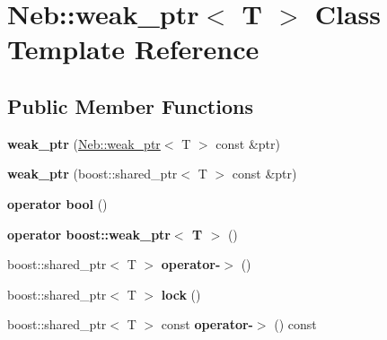 \hypertarget{classNeb_1_1weak__ptr}{\section{Neb\-:\-:weak\-\_\-ptr$<$ T $>$ Class Template Reference}
\label{classNeb_1_1weak__ptr}
}
\subsection*{Public Member Functions}
\begin{DoxyCompactItemize}
\item 
\hypertarget{classNeb_1_1weak__ptr_a831fec6c1355a9d91e834099c0dc6227}{{\bfseries weak\-\_\-ptr} (\hyperlink{classNeb_1_1weak__ptr}{Neb\-::weak\-\_\-ptr}$<$ T $>$ const \&ptr)}\label{classNeb_1_1weak__ptr_a831fec6c1355a9d91e834099c0dc6227}

\item 
\hypertarget{classNeb_1_1weak__ptr_ad29ba574546701e7ed8a0b452dcd76a6}{{\bfseries weak\-\_\-ptr} (boost\-::shared\-\_\-ptr$<$ T $>$ const \&ptr)}\label{classNeb_1_1weak__ptr_ad29ba574546701e7ed8a0b452dcd76a6}

\item 
\hypertarget{classNeb_1_1weak__ptr_a04c92f7e5ec8e3e83d2abce8365b8feb}{{\bfseries operator bool} ()}\label{classNeb_1_1weak__ptr_a04c92f7e5ec8e3e83d2abce8365b8feb}

\item 
\hypertarget{classNeb_1_1weak__ptr_ab67828010c104deb340eb460148b651d}{{\bfseries operator boost\-::weak\-\_\-ptr$<$ T $>$} ()}\label{classNeb_1_1weak__ptr_ab67828010c104deb340eb460148b651d}

\item 
\hypertarget{classNeb_1_1weak__ptr_afb380fd10451d5f26809091e54cde62f}{boost\-::shared\-\_\-ptr$<$ T $>$ {\bfseries operator-\/$>$} ()}\label{classNeb_1_1weak__ptr_afb380fd10451d5f26809091e54cde62f}

\item 
\hypertarget{classNeb_1_1weak__ptr_a2ec9a930e2ea181d3aa1d72d178b8a75}{boost\-::shared\-\_\-ptr$<$ T $>$ {\bfseries lock} ()}\label{classNeb_1_1weak__ptr_a2ec9a930e2ea181d3aa1d72d178b8a75}

\item 
\hypertarget{classNeb_1_1weak__ptr_af950ca38e1c55c8b428d6969cebcc189}{boost\-::shared\-\_\-ptr$<$ T $>$ const {\bfseries operator-\/$>$} () const }\label{classNeb_1_1weak__ptr_af950ca38e1c55c8b428d6969cebcc189}

\end{DoxyCompactItemize}
